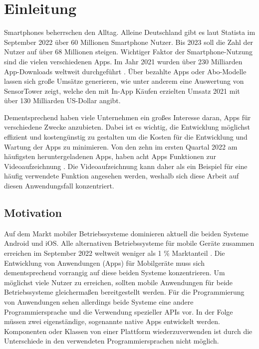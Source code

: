 \chapter{Einleitung}
\label{ch:einleitung}


Smartphones beherrschen den Alltag.
Alleine Deutschland gibt es laut Statista \cite{Statista_SmartphonesDeutschland} im September 2022 über 60 Millionen Smartphone Nutzer.
Bis 2023 soll die Zahl der Nutzer auf über 68 Millionen steigen.
Wichtiger Faktor der Smartphone-Nutzung sind die vielen verschiedenen Apps.
Im Jahr 2021 wurden über 230 Milliarden App-Downloads weltweit durchgeführt \cite{Statista_AppDownloads}.
Über bezahlte Apps oder Abo-Modelle lassen sich große Umsätze generieren, wie unter anderem eine Auswertung von SensorTower \cite{SensorTower_AppUmsatz} zeigt, welche den mit In-App Käufen erzielten Umsatz 2021 mit über 130 Milliarden US-Dollar angibt.

Dementsprechend haben viele Unternehmen ein großes Interesse daran, Apps für verschiedene Zwecke anzubieten.
Dabei ist es wichtig, die Entwicklung möglichst effizient und kostengünstig zu gestalten um die Kosten für die Entwicklung und Wartung der Apps zu minimieren.
Von den zehn im ersten Quartal 2022 am häufigsten heruntergeladenen Apps, haben acht Apps Funktionen zur Videoaufzeichnung \cite{Forbes_TopApps}.
Die Videoaufzeichnung kann daher als ein Beispiel für eine häufig verwendete Funktion angesehen werden, weshalb sich diese Arbeit auf diesen Anwendungsfall konzentriert.


\section{Motivation}
\label{sec:motivation}

Auf dem Markt mobiler Betriebssysteme dominieren aktuell die beiden Systeme Android und iOS.
Alle alternativen Betriebssysteme für mobile Geräte zusammen erreichen im September 2022 weltweit weniger als 1 \% Marktanteil \cite{mobile_market_share}.
Die Entwicklung von Anwendungen (Apps) für Mobilgeräte muss sich dementsprechend vorrangig auf diese beiden Systeme konzentrieren.
Um möglichst viele Nutzer zu erreichen, sollten mobile Anwendungen für beide Betriebssysteme gleichermaßen bereitgestellt werden.
Für die Programmierung von Anwendungen sehen allerdings beide Systeme eine andere Programmiersprache und die Verwendung spezieller \acp{API} vor.
In der Folge müssen zwei eigenständige, sogenannte native Apps entwickelt werden.
Komponenten oder Klassen von einer Plattform wiederzuverwenden ist durch die Unterschiede in den verwendeten Programmiersprachen nicht möglich.

